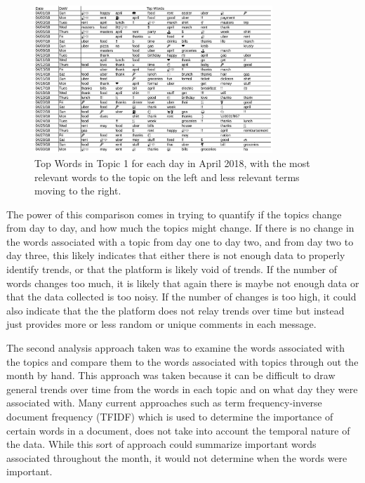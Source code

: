 \documentclass[conference]{IEEEtran}
\begin{document}
\begin{figure}[!t]
  \centering
  \includegraphics[width=0.8\textwidth]{Topic0FromDayToDay}
  \caption{Top Words in Topic 1 for each day in April 2018, with the most relevant words to the topic on the left and less relevant terms moving to the right.}
  \label{fig:Topic0FromDayToDay}
\end{figure}

The power of this comparison comes in trying to quantify if the topics change from day to day, and how much the topics might change. If there is no change in the words associated with a topic from day one to day two, and from day two to day three, this likely indicates that either there is not enough data to properly identify trends, or that the platform is likely void of trends. If the number of words changes too much, it is likely that again there is maybe not enough data or that the data collected is too noisy. If the number of changes is too high, it could also indicate that the the platform does not relay trends over time but instead just provides more or less random or unique comments in each message. 

The second analysis approach taken was to examine the words associated with the topics and compare them to the words associated with topics through out the month by hand. This approach was taken because it can be difficult to draw general trends over time from the words in each topic and on what day they were associated with. Many current approaches such as term frequency-inverse document frequency (TFIDF) \cite{TFIDF} which is used to determine the importance of certain words in a document, does not take into account the temporal nature of the data. While this sort of approach could summarize important words associated throughout the month, it would not determine when the words were important. 
\end{document}
